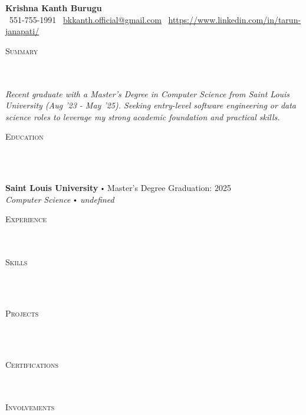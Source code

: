 \documentclass{article}
\newcommand{\school}[4]{
        \textbf{#1} \labelitemi #2 \hfill #3 \\ #4 \vspace*{5pt}
      }
\newcommand{\lineunder}{
        \vspace*{-8pt} \\ \hspace*{-18pt} 
        \hrulefill \\
        }
\newcommand{\header}[1]{{
        \hspace*{-15pt}\vspace*{6pt} \textsc{#1}} \vspace*{-6pt} 
        \lineunder
        }
\renewcommand{\labelitemi}{
        $\vcenter{\hbox{\tiny$\bullet$}}$\hspace*{3pt}
        }
\begin{document}
  
      \small
      \smallskip
      \vspace*{-44pt}
  
      \begin{center}
        {\LARGE \textbf{Krishna Kanth Burugu}} \\
        \faPhone\ 551-755-1991 \quad
        \faEnvelope\ \href{mailto:bkkanth.official@gmail.com}{bkkanth.official@gmail.com} \quad
        \faLinkedin\ \url{https://www.linkedin.com/in/tarun-janapati/}
      \end{center}
     \vspace*{4pt}%
      \header{Summary}
  
      {
        \textit{ Recent graduate with a Master's Degree in Computer Science from Saint Louis University (Aug '23 - May '25). Seeking entry-level software engineering or data science roles to leverage my strong academic foundation and practical skills.}
        }
  
      \vspace{15pt}
  
     \header{Education}
  
      {
        \school{Saint Louis University}{Master's Degree}{Graduation: 2025}{\textit{Computer Science \labelitemi undefined}}
        }
  
      \vspace*{4pt}%
      \header{Experience}
  
      {}
      \vspace*{4pt}%
      \header{Skills}
      {}
  
      \vspace*{4pt}%
      \header{Projects}
      {}
  
      \vspace*{4pt}%
      \header{Certifications}
      {}
      \vspace*{4pt}%
      \header{Involvements}
      {}
      
\end{document}
